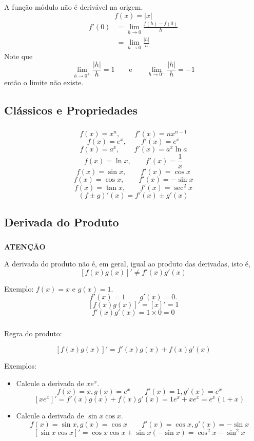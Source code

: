 \documentclass[10 pt]{beamer}
\newcommand{\myframe}[1]{
\begin{frame}
 \frametitle{\insertsection \qquad {\small \insertsubsection}}
#1
\end{frame}}
\newcommand{\limh}[1]{\lim_{h\rightarrow{#1}}}
\begin{document}
\myframe {
  A função módulo não é derivável na origem.
  $$ f(x) = \vert{x}\vert $$
  \vspace{0.5cm}
  \begin{align*}
    f'(0) & = \limh{0}\frac{f(h)-f(0)}{h} \\
      & = \limh{0}\frac{\vert{h}\vert}{h}
  \end{align*}
  Note que
    $$\limh{0^+}\frac{\vert{h}\vert}{h} = 1 \qquad \mbox{e} \qquad
      \limh{0^-}\frac{\vert{h}\vert}{h} = -1 $$
  então o limite não existe.
}

\subsection{Cl\'assicos e Propriedades}

\myframe {
  $$ f(x) = x^n, \qquad f'(x) = nx^{n-1} $$
  $$ f(x) = e^x, \qquad f'(x) = e^x $$
  $$ f(x) = a^x, \qquad f'(x) = a^x\ln a $$
  $$ f(x) = \ln x, \qquad f'(x) = \frac{1}{x} $$
  $$ f(x) = \sin x, \qquad f'(x) = \cos x $$
  $$ f(x) = \cos x, \qquad f'(x) = -\sin x $$
  $$ f(x) = \tan x, \qquad f'(x) = \sec^2 x $$
  \vspace{0.2 cm}
  $$ (f \pm g)'(x) = f'(x) \pm g'(x) $$
}

\subsection{ Derivada do Produto }

\myframe {
  \begin{center}
    {\bf ATENÇÃO}
  \end{center}
  A derivada do produto não é, em geral, igual ao produto das derivadas,
  isto é,
  $$ [f(x)g(x)]' \neq f'(x)g'(x) $$

  Exemplo: $f(x) = x$ e $g(x) = 1$.
  $$ f'(x) = 1 \qquad g'(x) = 0. $$
  $$ [f(x)g(x)]' = [x]' = 1 $$
  $$ f'(x)g'(x) = 1\times 0 = 0 $$
}

\myframe {
  Regra do produto:

  $$ [f(x)g(x)]' = f'(x)g(x) + f(x)g'(x) $$

  Exemplos: 
  \begin{itemize}
    \item Calcule a derivada de $xe^x$.
      $$ f(x) = x, g(x) = e^x \qquad f'(x) = 1, g'(x) = e^x $$
      $$ [xe^x]' = f'(x)g(x) + f(x)g'(x) = 1e^x + xe^x = e^x(1+x) $$
    \item Calcule a derivada de $\sin x \cos x$.
      $$ f(x) = \sin x, g(x) = \cos x \qquad f'(x) = \cos x, g'(x) = -\sin x$$
      $$ [\sin x\cos x]' = \cos x\cos x + \sin x(-\sin x) = \cos^2 x - \sin^2 x$$
  \end{itemize}
}
\end{document}

